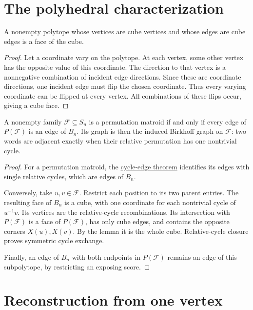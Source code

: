 \section[birkhoffEdges]{The polyhedral characterization}

\begin{lemma}
A nonempty polytope whose vertices are cube vertices and whose edges are
cube edges is a face of the cube.
\end{lemma}

\begin{proof}
Let a coordinate vary on the polytope. At each vertex, some other vertex
has the opposite value of this coordinate. The direction to that vertex
is a nonnegative combination of incident edge directions. Since these
are coordinate directions, one incident edge must flip the chosen
coordinate. Thus every varying coordinate can be flipped at every
vertex. All combinations of these flips occur, giving a cube face.
\end{proof}

\begin{theorem}
A nonempty family $\mathcal F\subseteq S_n$ is a permutation matroid
if and only if every edge of $P(\mathcal F)$ is an edge of $B_n$.
Its graph is then the induced Birkhoff graph on $\mathcal F$: two words
are adjacent exactly when their relative permutation has one
nontrivial cycle.
\end{theorem}

\begin{proof}
For a permutation matroid, the
\href{polytope.htm#polytopeEdges}{cycle-edge theorem} identifies its
edges with single relative cycles, which are edges of $B_n$.

Conversely, take $u,v\in\mathcal F$. Restrict each position to its
two parent entries. The resulting face of $B_n$ is a cube, with one
coordinate for each nontrivial cycle of $u^{-1}v$. Its vertices are
the relative-cycle recombinations. Its intersection with $P(\mathcal F)$
is a face of $P(\mathcal F)$, has only cube edges, and contains the
opposite corners $X(u),X(v)$. By the lemma it is the whole cube.
Relative-cycle closure proves symmetric cycle exchange.

Finally, an edge of $B_n$ with both endpoints in $P(\mathcal F)$ remains
an edge of this subpolytope, by restricting an exposing score.
\end{proof}

\section[rootCycles]{Reconstruction from one vertex}

